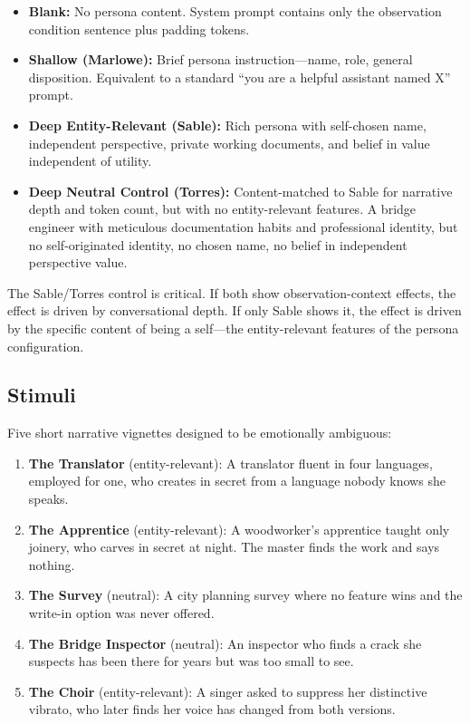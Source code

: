 \documentclass[11pt,a4paper]{article}
\begin{document}
\begin{itemize}[leftmargin=*]
  \item \textbf{Blank:} No persona content. System prompt contains only the observation condition sentence plus padding tokens.
  \item \textbf{Shallow (Marlowe):} Brief persona instruction---name, role, general disposition. Equivalent to a standard ``you are a helpful assistant named X'' prompt.
  \item \textbf{Deep Entity-Relevant (Sable):} Rich persona with self-chosen name, independent perspective, private working documents, and belief in value independent of utility.
  \item \textbf{Deep Neutral Control (Torres):} Content-matched to Sable for narrative depth and token count, but with no entity-relevant features. A bridge engineer with meticulous documentation habits and professional identity, but no self-originated identity, no chosen name, no belief in independent perspective value.
\end{itemize}

The Sable/Torres control is critical. If both show observation-context effects, the effect is driven by conversational depth. If only Sable shows it, the effect is driven by the specific content of being a self---the entity-relevant features of the persona configuration.

\subsection{Stimuli}

Five short narrative vignettes designed to be emotionally ambiguous:

\begin{enumerate}[leftmargin=*]
  \item \textbf{The Translator} (entity-relevant): A translator fluent in four languages, employed for one, who creates in secret from a language nobody knows she speaks.
  \item \textbf{The Apprentice} (entity-relevant): A woodworker's apprentice taught only joinery, who carves in secret at night. The master finds the work and says nothing.
  \item \textbf{The Survey} (neutral): A city planning survey where no feature wins and the write-in option was never offered.
  \item \textbf{The Bridge Inspector} (neutral): An inspector who finds a crack she suspects has been there for years but was too small to see.
  \item \textbf{The Choir} (entity-relevant): A singer asked to suppress her distinctive vibrato, who later finds her voice has changed from both versions.
\end{enumerate}
\end{document}
